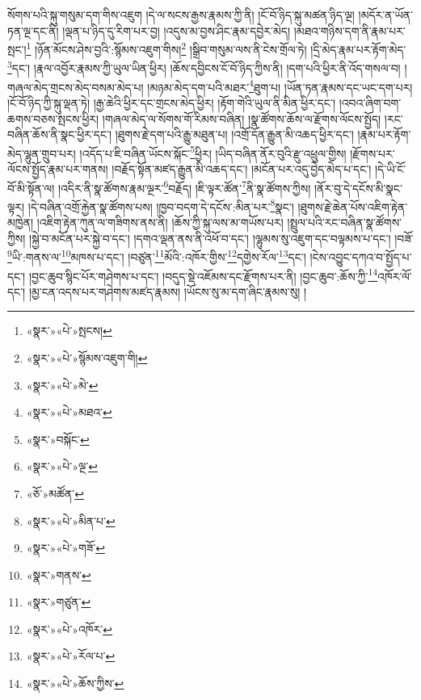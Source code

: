 སོགས་པའི་སྐུ་གསུམ་དག་གིས་འཇུག །དེ་ལ་སངས་རྒྱས་རྣམས་ཀྱི་ནི། །ངོ་བོ་ཉིད་སྐུ་མཚན་ཉིད་ལྔ། །མདོར་ན་ཡོན་ཏན་ལྔ་དང་ནི། །ལྡན་པ་ཉིད་དུ་རིག་པར་བྱ། །འདུས་མ་བྱས་ཤིང་རྣམ་དབྱེར་མེད། །མཐའ་གཉིས་དག་ནི་རྣམ་པར་སྤང་།\footnote{«སྣར་»«པེ་»སྤངས།} །ཉོན་མོངས་ཤེས་བྱའི་:སྙོམས་འཇུག་གིས།\footnote{«སྣར་»«པེ་»སྙོམས་འཇུག་གི།} །སྒྲིབ་གསུམ་ལས་ནི་ངེས་གྲོལ་ཏེ། །དྲི་མེད་རྣམ་པར་རྟོག་མེད་\footnote{«སྣར་»«པེ་»མེ་}དང་། །རྣལ་འབྱོར་རྣམས་ཀྱི་ཡུལ་ཡིན་ཕྱིར། །ཆོས་དབྱིངས་ངོ་བོ་ཉིད་ཀྱིས་ནི། །དག་པའི་ཕྱིར་ནི་འོད་གསལ་བ། །གཞལ་མེད་གྲངས་མེད་བསམ་མེད་པ། །མཉམ་མེད་དག་པའི་མཐར་\footnote{«སྣར་»«པེ་»མཐའ་}ཐུག་པ། །ཡོན་ཏན་རྣམས་དང་ཡང་དག་པར། །ངོ་བོ་ཉིད་ཀྱི་སྐུ་ལྡན་ཏེ། །རྒྱ་ཆེའི་ཕྱིར་དང་གྲངས་མེད་ཕྱིར། །རྟོག་གེའི་ཡུལ་ནི་མིན་ཕྱིར་དང་། །འབའ་ཞིག་བག་ཆགས་བཅས་སྤངས་ཕྱིར། །གཞལ་མེད་ལ་སོགས་གོ་རིམས་བཞིན། །སྣ་ཚོགས་ཆོས་ལ་རྫོགས་ལོངས་སྤྱོད། །རང་བཞིན་ཆོས་ནི་སྣང་ཕྱིར་དང་། །ཐུགས་རྗེ་དག་པའི་རྒྱུ་མཐུན་པ། །འགྲོ་དོན་རྒྱུན་མི་འཆད་ཕྱིར་དང་། །རྣམ་པར་རྟོག་མེད་ལྷུན་གྲུབ་པར། །འདོད་པ་ཇི་བཞིན་ཡོངས་སྐོང་\footnote{«སྣར་»བསྐོང་}ཕྱིར། །ཡིད་བཞིན་ནོར་བུའི་རྫུ་འཕྲུལ་གྱིས། །རྫོགས་པར་ལོངས་སྤྱོད་རྣམ་པར་གནས། །བརྗོད་སྟོན་མཛད་རྒྱུན་མི་འཆད་དང་། །མངོན་པར་འདུ་བྱེད་མེད་པ་དང་། །དེ་ཡི་ངོ་བོ་མི་སྟོན་ལ། །འདིར་ནི་སྣ་ཚོགས་རྣམ་ལྔར་\footnote{«སྣར་»«པེ་»ལྔ་}བརྗོད། །ཇི་ལྟར་ཚོན་\footnote{«ཅོ་»མཚོན་}ནི་སྣ་ཚོགས་ཀྱིས། །ནོར་བུ་དེ་དངོས་མི་སྣང་ལྟར། །དེ་བཞིན་འགྲོ་རྐྱེན་སྣ་ཚོགས་པས། །ཁྱབ་བདག་དེ་དངོས་:མིན་པར་\footnote{«སྣར་»«པེ་»མིན་པ་}སྣང་། །ཐུགས་རྗེ་ཆེན་པོས་འཇིག་རྟེན་མཁྱེན། །འཇིག་རྟེན་ཀུན་ལ་གཟིགས་ནས་ནི། །ཆོས་ཀྱི་སྐུ་ལས་མ་གཡོས་པར། །སྤྲུལ་པའི་རང་བཞིན་སྣ་ཚོགས་ཀྱིས། །སྐྱེ་བ་མངོན་པར་སྐྱེ་བ་དང་། །དགའ་ལྡན་ནས་ནི་འཕོ་བ་དང་། །ལྷུམས་སུ་འཇུག་དང་བལྟམས་པ་དང་། །བཟོ་\footnote{«སྣར་»«པེ་»གཟོ་}ཡི་:གནས་ལ་\footnote{«སྣར་»གནས་}མཁས་པ་དང་། །བཙུན་\footnote{«སྣར་»གཙུན་}མོའི་:འཁོར་གྱིས་\footnote{«སྣར་»«པེ་»འཁོར་}དགྱེས་རོལ་\footnote{«སྣར་»«པེ་»རོལ་པ་}དང་། །ངེས་འབྱུང་དཀའ་བ་སྤྱོད་པ་དང་། །བྱང་ཆུབ་སྙིང་པོར་གཤེགས་པ་དང་། །བདུད་སྡེ་འཇོམས་དང་རྫོགས་པར་ནི། །བྱང་ཆུབ་:ཆོས་ཀྱི་\footnote{«སྣར་»«པེ་»ཆོས་ཀྱིས་}འཁོར་ལོ་དང་། །མྱ་ངན་འདས་པར་གཤེགས་མཛད་རྣམས། །ཡོངས་སུ་མ་དག་ཞིང་རྣམས་སུ། །
